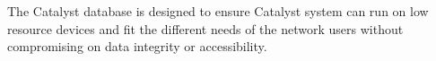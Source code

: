 The Catalyst database is designed to ensure Catalyst system can run on low resource devices and fit the different needs of the network users without compromising on data integrity or accessibility.